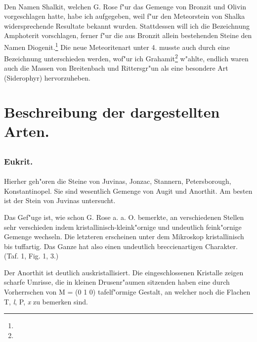 \documentclass[a4paper, 11pt, oneside, polutonikogreek, german]{article}
\begin{document}
\paragraph*{}
Den Namen Shalkit, welchen G. Rose f"ur das Gemenge von Bronzit und Olivin vorgeschlagen hatte, habe ich aufgegeben, weil f"ur den Meteorstein von Shalka widersprechende Resultate bekannt wurden. Stattdessen will ich die Bezeichnung Amphoterit vorschlagen, ferner f"ur die aus Bronzit allein bestehenden Steine den Namen Diogenit.\footnote{} Die neue Meteoritenart unter 4. musste auch durch eine Bezeichnung unterschieden werden, wof"ur ich Grahamit\footnote{} w"ahlte, endlich waren auch die Massen von Breitenbach und Rittersgr"un als eine besondere Art (Siderophyr) hervorzuheben.
\clearpage
\section{Beschreibung der dargestellten Arten.}
\subsection{}
\subsubsection{Eukrit.}
\paragraph{}
Hierher geh"oren die Steine von Juvinas, Jonzac, Stannern, Petersborough, Konstantinopel. Sie sind wesentlich Gemenge von Augit und Anorthit. Am besten ist der Stein von Juvinas untersucht.

Das Gef"uge ist, wie schon G. Rose a. a. O. bemerkte, an verschiedenen Stellen sehr verschieden indem kristallinisch-kleink"ornige und undeutlich feink"ornige Gemenge wechseln. Die letzteren erscheinen unter dem Mikroskop kristallinisch bis tuffartig. Das Ganze hat also einen undeutlich breccienartigen Charakter. (Taf. 1, Fig. 1, 3.)

Der Anorthit ist deutlich auskristallisiert. Die eingeschlossenen Kristalle zeigen scharfe Umrisse, die in kleinen Drusenr"aumen sitzenden haben eine durch Vorherrschen von M = (0 1 0) tafelf"ormige Gestalt, an welcher noch die Flachen T, \emph{l}, P, \emph{x} zu bemerken sind.
\end{document}
